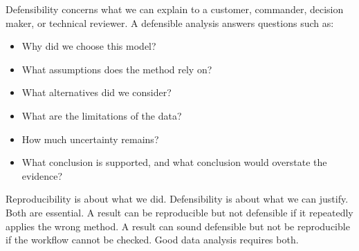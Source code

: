 Defensibility concerns what we can explain to a customer, commander, decision maker, or technical reviewer.  A defensible analysis answers questions such as:
\begin{itemize}
  \item Why did we choose this model?
  \item What assumptions does the method rely on?
  \item What alternatives did we consider?
  \item What are the limitations of the data?
  \item How much uncertainty remains?
  \item What conclusion is supported, and what conclusion would overstate the evidence?
\end{itemize}

Reproducibility is about what we did.  Defensibility is about what we can justify.  Both are essential.  A result can be reproducible but not defensible if it repeatedly applies the wrong method.  A result can sound defensible but not be reproducible if the workflow cannot be checked.  Good data analysis requires both.


